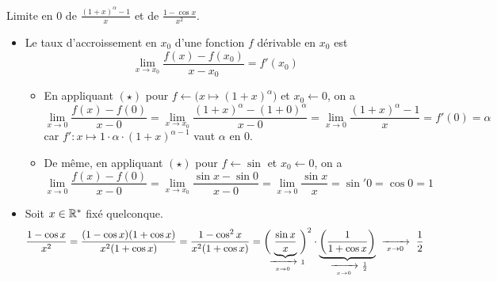 \documentclass{article}
\renewenvironment{question_kholle}[2][ ]
{
	\subsection{\texorpdfstring{#2}{}}
	\notblank{#1}
	{
		\noindent #1
		\bigbreak
	}
	{}
	\begin{proof}
}
{
	\end{proof}
}
\begin{document}
\begin{question_kholle}{Limite en $0$ de $\displaystyle\frac{(1+x)^{\alpha}-1}{x}$ et de $\displaystyle\frac{1-\cos x}{x^2}$.}
	\hfill
	\begin{itemize}[label=$*$]
		\item Le taux d'accroissement en $x_0$ d'une fonction $f$ dérivable en $x_0$ est
		      \[\tag{$\star$}
			      \lim_{x\to x_0}\frac{f(x)-f(x_0)}{x-x_0}=f'(x_0)
		      \]
		      \begin{itemize}
			      \item En appliquant $(\star)$ pour $f\leftarrow \bigl(x\mapsto (1+x)^{\alpha}\bigr)$ et $x_0\leftarrow 0$, on a
			            \[
				            \lim_{x\to 0}\frac{f(x)-f(0)}{x-0}=\lim_{x\to x_0}\frac{(1+x)^{\alpha}-(1+0)^{\alpha}}{x-0} = \lim_{x\to 0}\frac{(1+x)^{\alpha}-1}{x}=f'(0)=\alpha
			            \]
			            car $f': x\mapsto 1\cdot \alpha\cdot (1+x)^{\alpha - 1}$ vaut $\alpha$ en $0$.
			      \item De même, en appliquant $(\star)$ pour $f\leftarrow \sin$ et $x_0\leftarrow 0$, on a
			            \[
				            \lim_{x\to 0}\frac{f(x)-f(0)}{x-0}=\lim_{x\to x_0}\frac{\sin x-\sin 0}{x-0} = \lim_{x\to 0}\frac{\sin x}{x}=\sin' 0=\cos 0=1
			            \]
		      \end{itemize}
		\item Soit $x\in\mathbb R^*$ fixé quelconque.
		      \[
			      \frac{1 - \cos x}{x^2} = \frac{(1-\cos x)(1+\cos x)}{x^2(1+\cos x)} = \frac{1-\cos^2 x}{x^2(1+\cos x)}=\biggl(\!\!\!\smash{\underbrace{\frac{\sin x}{x}}_{\ \xrightarrow[\;x \to 0\;]{}\ 1}}\!\!\!\biggr)^2\cdot\underbrace{\left(\frac{1}{1+\cos x}\right)}_{\ \xrightarrow[\;x \to 0\;]{}\ \frac{1}{2}} \ \xrightarrow[\;x \to 0\;]{}\ \frac{1}{2}
		      \]
	\end{itemize}
\end{question_kholle}
\end{document}
